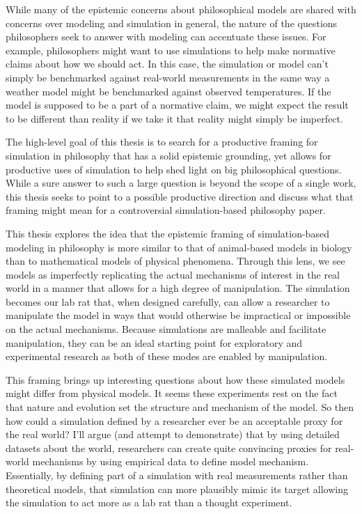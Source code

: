 While many of the epistemic concerns about philosophical models are
shared with concerns over modeling and simulation in general, the nature
of the questions philosophers seek to answer with modeling can
accentuate these issues. For example, philosophers might want to use
simulations to help make normative claims about how we should act. In
this case, the simulation or model can't simply be benchmarked against
real-world measurements in the same way a weather model might be
benchmarked against observed temperatures. If the model is supposed to
be a part of a normative claim, we might expect the result to be
different than reality if we take it that reality might simply be
imperfect.

The high-level goal of this thesis is to search for a productive framing
for simulation in philosophy that has a solid epistemic grounding, yet
allows for productive uses of simulation to help shed light on big
philosophical questions. While a sure answer to such a large question is
beyond the scope of a single work, this thesis seeks to point to a
possible productive direction and discuss what that framing might mean
for a controversial simulation-based philosophy paper.

This thesis explores the idea that the epistemic framing of
simulation-based modeling in philosophy is more similar to that of
animal-based models in biology than to mathematical models of physical
phenomena. Through this lens, we see models as imperfectly replicating
the actual mechanisms of interest in the real world in a manner that
allows for a high degree of manipulation. The simulation becomes our lab
rat that, when designed carefully, can allow a researcher to manipulate
the model in ways that would otherwise be impractical or impossible on
the actual mechanisms. Because simulations are malleable and facilitate
manipulation, they can be an ideal starting point for exploratory and
experimental research as both of these modes are enabled by
manipulation.

This framing brings up interesting questions about how these simulated
models might differ from physical models. It seems these experiments
rest on the fact that nature and evolution set the structure and
mechanism of the model. So then how could a simulation defined by a
researcher ever be an acceptable proxy for the real world? I'll argue
(and attempt to demonstrate) that by using detailed datasets about the
world, researchers can create quite convincing proxies for real-world
mechanisms by using empirical data to define model mechanism.
Essentially, by defining part of a simulation with real measurements
rather than theoretical models, that simulation can more plausibly mimic
its target allowing the simulation to act more as a lab rat than a
thought experiment.

